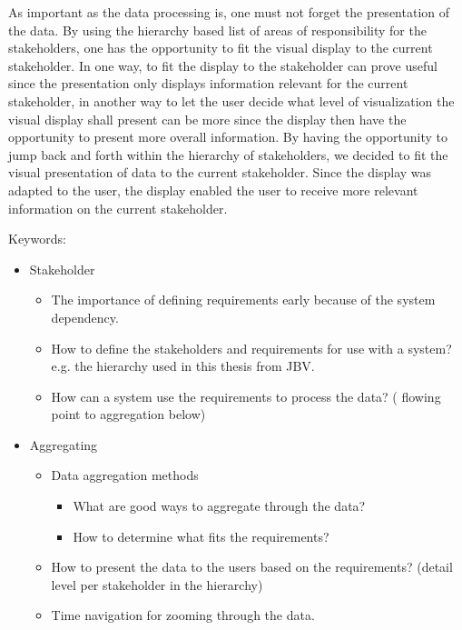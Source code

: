 As important as the data processing is, one must not forget the presentation of
the data. By using the hierarchy based list of areas of responsibility for the
stakeholders, one has the opportunity to fit the visual display to the current
stakeholder. In one way, to fit the display to the stakeholder can prove 
useful since the presentation only displays information relevant for the 
current stakeholder, in another way to let the user decide what level of 
visualization the visual display shall present can be more since the display 
then have the opportunity to present more overall information. By having the 
opportunity to jump
back and forth within the hierarchy of stakeholders, we decided to fit the 
visual presentation of data to the current stakeholder. Since the display was 
adapted to the user, the display enabled the user to receive more relevant 
information on the current stakeholder.

Keywords:
\begin{itemize}
	\item Stakeholder
	\begin{itemize}
		\item The importance of defining requirements early because of the 
		system dependency.
		\item How to define the stakeholders and requirements for use with a 
		system?	e.g. the hierarchy used in this thesis from JBV.
		\item How can a system use the requirements to process the data? (
		flowing point to aggregation below)
	\end{itemize}
	\item Aggregating
	\begin{itemize}
		\item Data aggregation methods
		\begin{itemize}
			\item What are good ways to aggregate through the data?
			\item How to determine what fits the requirements?
		\end{itemize}
		\item How to present the data to the users based on the requirements? 
		(detail level per stakeholder in the hierarchy)
		\item Time navigation for zooming through the data.
	\end{itemize}
\end{itemize}




